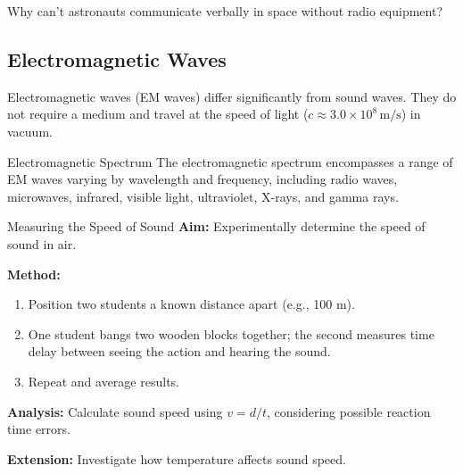 
\begin{stopandthink}
Why can't astronauts communicate verbally in space without radio equipment?
\end{stopandthink}

\subsection{Electromagnetic Waves}
\FloatBarrier

Electromagnetic waves (EM waves) differ significantly from sound waves. They do not require a medium and travel at the speed of light (\(c \approx 3.0\times10^8\,\text{m/s}\)) in vacuum.

\begin{marginfigure}[0pt]
\caption{Electromagnetic spectrum showing wave types from radio waves to gamma rays.}
\end{marginfigure}

\begin{keyconcept}{Electromagnetic Spectrum}
The electromagnetic spectrum encompasses a range of EM waves varying by wavelength and frequency, including radio waves, microwaves, infrared, visible light, ultraviolet, X-rays, and gamma rays.
\end{keyconcept}


\begin{investigation}{Measuring the Speed of Sound}
\textbf{Aim:} Experimentally determine the speed of sound in air.

\textbf{Method:}
\begin{enumerate}
\item Position two students a known distance apart (e.g., 100 m).
\item One student bangs two wooden blocks together; the second measures time delay between seeing the action and hearing the sound.
\item Repeat and average results.
\end{enumerate}

\textbf{Analysis:}
Calculate sound speed using \(v = d/t\), considering possible reaction time errors.

\textbf{Extension:}
Investigate how temperature affects sound speed.
\end{investigation}

